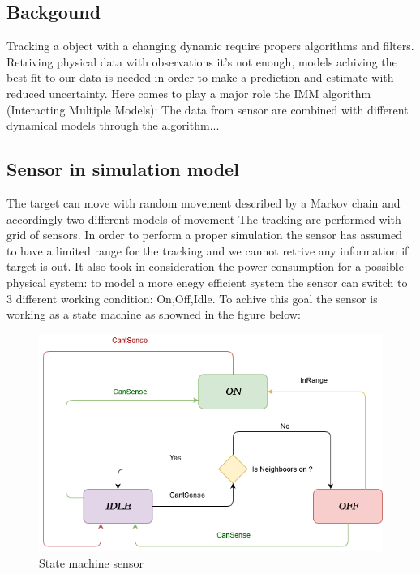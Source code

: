 \documentclass{article}
\begin{document}
\begin{multicols}{2}
    \section*{Backgound}
    \justify
        Tracking a object with a changing dynamic require propers algorithms and filters. Retriving physical data with
        observations it's not enough, models achiving the best-fit to our data is needed in order to make a prediction and estimate 
        with reduced uncertainty. Here comes to play a major role the IMM algorithm (Interacting Multiple Models): The data
        from sensor are combined with different dynamical models through the algorithm... 
        \subsection*{Sensor in simulation model}
            The target can move with random movement described by a Markov chain and accordingly two different models of movement
            The tracking are performed with grid of sensors. In order to perform a proper simulation the sensor has assumed to have a limited
            range for the tracking and we cannot retrive any information if target is out. It also took in consideration the power consumption 
            for a possible physical system: to model a more enegy efficient system the sensor can switch to 3 different working condition: On,Off,Idle.
            To achive this goal the sensor is working as a state machine as showned in the figure below: 
                \begin{figure}[h!]
                \centering
                \includegraphics[scale=0.05]{UntitledDiagram.png}
                \caption{State machine sensor}

\end{figure}
\end{multicols}
\end{document}
